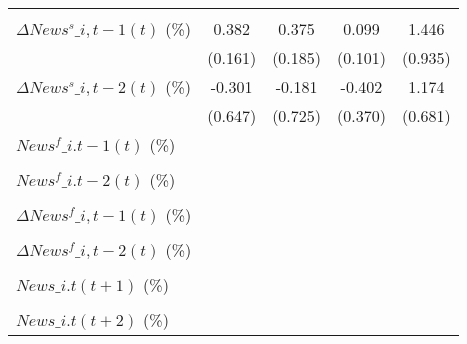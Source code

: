 {\begin{tabular}{l*{4}{c}}
                    &                     &                     &                     &                     \\
\addlinespace
$ \Delta News^s\_{i,t-1}(t)$ (\%)&       0.382\sym{**} &       0.375\sym{**} &       0.099         &       1.446         \\
                    &     (0.161)         &     (0.185)         &     (0.101)         &     (0.935)         \\
\addlinespace
$ \Delta News^s\_{i,t-2}(t)$ (\%)&      -0.301         &      -0.181         &      -0.402         &       1.174\sym{*}  \\
                    &     (0.647)         &     (0.725)         &     (0.370)         &     (0.681)         \\
\addlinespace
$ News^f\_{i.t-1}(t)$ (\%)&                     &                     &                     &                     \\
                    &                     &                     &                     &                     \\
\addlinespace
$ News^f\_{i.t-2}(t)$ (\%)&                     &                     &                     &                     \\
                    &                     &                     &                     &                     \\
\addlinespace
$ \Delta News^f\_{i,t-1}(t)$ (\%)&                     &                     &                     &                     \\
                    &                     &                     &                     &                     \\
\addlinespace
$ \Delta News^f\_{i,t-2}(t)$ (\%)&                     &                     &                     &                     \\
                    &                     &                     &                     &                     \\
\addlinespace
$ News\_{i.t}(t+1)$ (\%)&                     &                     &                     &                     \\
                    &                     &                     &                     &                     \\
\addlinespace
$ News\_{i.t}(t+2)$ (\%)&                     &                     &                     &                     \\

\end{tabular}}
